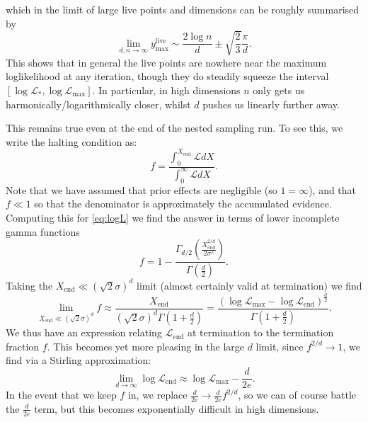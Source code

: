 \documentclass[usenatbib]{mnras}
\begin{document}
which in the limit of large live points and dimensions can be roughly summarised by
\begin{equation}\label{eq:ylivemax}
	    \lim_{d,n\to\infty} y_\mathrm{max}^\mathrm{live} \sim \frac{2\log n}{d} \pm \sqrt{\frac{2}{3}}\frac{\pi}{d}.
\end{equation}
This shows that in general the live points are nowhere near the maximum loglikelihood at any iteration, though they do steadily squeeze the interval $[\log\mathcal{L}_*,\log\mathcal{L}_\mathrm{max}]$. In particular, in high dimensions $n$ only gets us harmonically/logarithmically closer, whilst $d$ pushes us linearly further away.
\par
This remains true even at the end of the nested sampling run. To see this, we write the halting condition as:
\begin{equation}
    f = \frac{\int_0^{X_\mathrm{end}} \mathcal{L} dX}{\int_0^\infty \mathcal{L} dX}.
    \label{eq:fint}
\end{equation}
Note that we have assumed that prior effects are negligible (so $1=\infty$), and that $f \ll 1$ so that the denominator is approximately the accumulated evidence. Computing this for \cref{eq:logL} we find the answer in terms of lower incomplete gamma functions
\begin{equation}
    f = 1- \frac{\Gamma_{d/2}\left(\frac{X_\mathrm{end}^{2/d}}{2\sigma^2}\right)}{\Gamma\left(\frac{d}{2}\right)}.
    \label{eq:f}
\end{equation}
Taking the $X_\mathrm{end}\ll (\sqrt{2}\sigma)^d$ limit (almost certainly valid at termination) we find
\begin{equation}
    \lim_{X_\mathrm{end}\ll (\sqrt{2}\sigma)^d} f \approx \frac{X_\mathrm{end}}{(\sqrt{2}\sigma)^d\Gamma(1+\frac{d}{2})} = \frac{(\log\mathcal{L}_\mathrm{max}-\log\mathcal{L}_\mathrm{end})^{\frac{d}{2}}}{\Gamma(1+\frac{d}{2})}.
\end{equation}
We thus have an expression relating $\mathcal{L}_\mathrm{end}$ at termination to the termination fraction $f$. This becomes yet more pleasing in the large $d$ limit, since $f^{2/d}\to 1$, we find via a Stirling approximation:
\begin{equation}
    \lim_{d\to\infty} \log\mathcal{L}_\mathrm{end} \approx \log\mathcal{L}_\mathrm{max} - \frac{d}{2e}.
\end{equation}
In the event that we keep $f$ in, we replace $\frac{d}{2e}\to \frac{d}{2e}f^{2/d}$, so we can of course battle the $\frac{d}{2e}$ term, but this becomes exponentially difficult in high dimensions.
\end{document}
